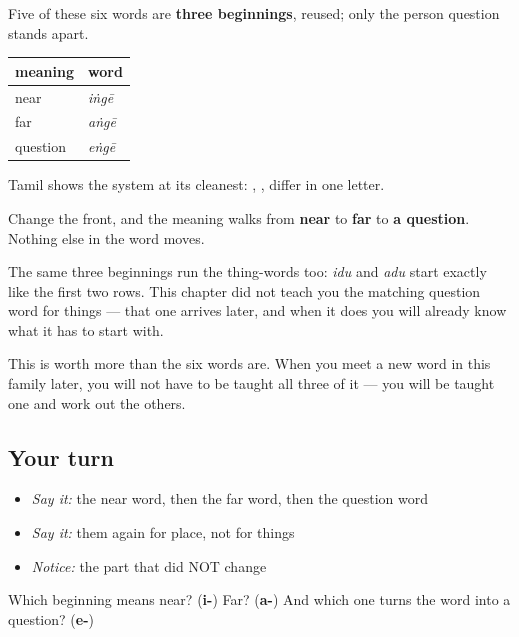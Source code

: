 \begin{grammarlens}[title={Grammar lens: one slot changes}]
Five of these six words are \textbf{three beginnings}, reused; only the person question stands apart.

\noindent
\begin{tabularx}{\linewidth}{@{}>{\raggedright\arraybackslash}X>{\raggedright\arraybackslash}X@{}}
\toprule
\textbf{meaning} & \textbf{word} \\
\midrule
near & \textbf{\ta{இங்கே}} \emph{iṅgē} \\
far & \textbf{\ta{அங்கே}} \emph{aṅgē} \\
question & \textbf{\ta{எங்கே}} \emph{eṅgē} \\
\bottomrule
\end{tabularx}

Tamil shows the system at its cleanest: , ,  differ in one letter.

Change the front, and the meaning walks from \textbf{near} to \textbf{far} to \textbf{a question}. Nothing else in the word moves.

The same three beginnings run the thing-words too: \textbf{} \emph{idu} and \textbf{} \emph{adu} start exactly like the first two rows. This chapter did not teach you the matching question word for things — that one arrives later, and when it does you will already know what it has to start with.

This is worth more than the six words are. When you meet a new word in this family later, you will not have to be taught all three of it — you will be taught one and work out the others.
\end{grammarlens}

\subsection*{Your turn}
\begin{itemize}
\raggedright
  \item \emph{Say it:} the near word, then the far word, then the question word
  \item \emph{Say it:} them again for place, not for things
  \item \emph{Notice:} the part that did NOT change
\end{itemize}

\begin{tcolorbox}[breakable,colback=teal!4,colframe=teal!35!black,title={Before you move on}]
Which beginning means near? (\textbf{i-}) Far? (\textbf{a-}) And which one turns the word into a question? (\textbf{e-})
\end{tcolorbox}
